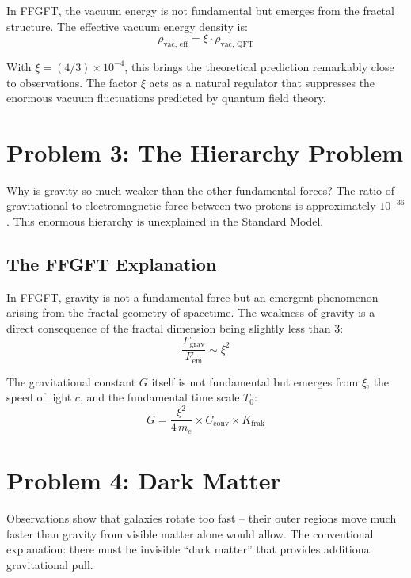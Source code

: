 In FFGFT, the vacuum energy is not fundamental but emerges from the fractal structure. The effective vacuum energy density is:
\begin{equation}
\rho_{\text{vac, eff}} = \xi \cdot \rho_{\text{vac, QFT}}
\end{equation}

With $\xi = (4/3) \times 10^{-4}$, this brings the theoretical prediction remarkably close to observations. The factor $\xi$ acts as a natural regulator that suppresses the enormous vacuum fluctuations predicted by quantum field theory.

\section{Problem 3: The Hierarchy Problem}

Why is gravity so much weaker than the other fundamental forces? The ratio of gravitational to electromagnetic force between two protons is approximately $10^{-36}$. This enormous hierarchy is unexplained in the Standard Model.

\subsection{The FFGFT Explanation}

In FFGFT, gravity is not a fundamental force but an emergent phenomenon arising from the fractal geometry of spacetime. The weakness of gravity is a direct consequence of the fractal dimension being slightly less than 3:
\begin{equation}
\frac{F_{\text{grav}}}{F_{\text{em}}} \sim \xi^{2}
\end{equation}

The gravitational constant $G$ itself is not fundamental but emerges from $\xi$, the speed of light $c$, and the fundamental time scale $T_0$:
\begin{equation}
G = \frac{\xi^2}{4\,m_e} \times C_{\text{conv}} \times K_{\text{frak}}
\end{equation}

\section{Problem 4: Dark Matter}

Observations show that galaxies rotate too fast -- their outer regions move much faster than gravity from visible matter alone would allow. The conventional explanation: there must be invisible ``dark matter'' that provides additional gravitational pull.

